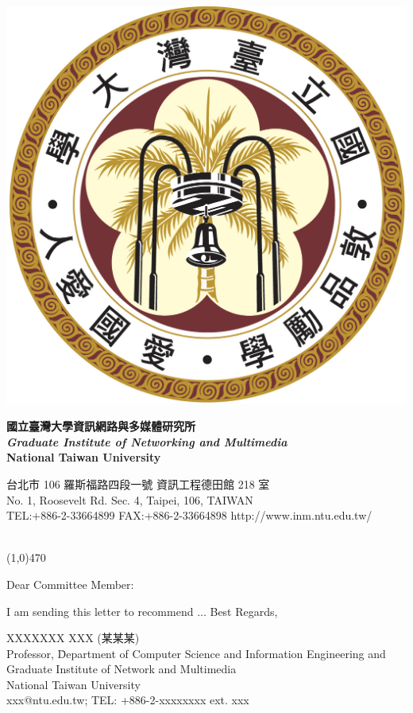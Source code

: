 \documentclass[12pt,letterpaper]{article}
\begin{document}
\begin{center}
\begin{minipage}{0.12\textwidth}
\includegraphics[width=\linewidth]{ntu_logo}
\end{minipage}
\hspace{1em}
\begin{minipage}{0.55\textwidth}
\textbf{國立臺灣大學資訊網路與多媒體研究所}\\
\textbf{\textit{Graduate Institute of Networking and Multimedia}}\\
\textbf{National Taiwan University}\\
\vspace{-1.2em}
\begin{spacing}{0.75}
{\footnotesize
台北市 106 羅斯福路四段一號 資訊工程德田館 218 室\\
No. 1, Roosevelt Rd. Sec. 4, Taipei, 106, TAIWAN\\
TEL:+886-2-33664899 FAX:+886-2-33664898
http://www.inm.ntu.edu.tw/
}
\end{spacing}
\end{minipage}
\\ \vspace{-5pt}\linethickness{0.5mm}\line(1,0){470}
\end{center}

\begin{spacing}{1.05}
Dear Committee Member:

I am sending this letter to recommend ...
\vfill
Best Regards,

\end{spacing}

\begin{tabbing}
XXXXXXX XXX (某某某)\\
Professor, \= Department of Computer Science and Information Engineering and \\
\> Graduate Institute of Network and Multimedia\\
National Taiwan University\\
xxx@ntu.edu.tw; TEL: +886-2-xxxxxxxx ext. xxx
\end{tabbing}
\end{document}
